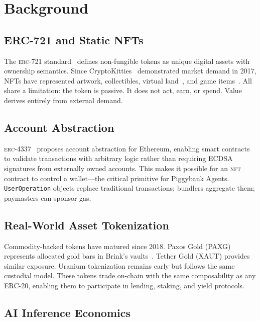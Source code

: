 \documentclass[11pt,letterpaper]{article}
\newcommand{\NFT}{\textsc{nft}}
\newcommand{\ERC}{\textsc{erc}}
\begin{document}
\section{Background}
\label{sec:background}

\subsection{ERC-721 and Static NFTs}

The \ERC{}-721 standard~\cite{erc721} defines non-fungible tokens as unique digital assets with ownership semantics. Since CryptoKitties~\cite{cryptokitties} demonstrated market demand in 2017, NFTs have represented artwork, collectibles, virtual land~\cite{decentraland, sandbox}, and game items~\cite{axie}. All share a limitation: the token is passive. It does not act, earn, or spend. Value derives entirely from external demand.

\subsection{Account Abstraction}

\ERC{}-4337~\cite{erc4337} proposes account abstraction for Ethereum, enabling smart contracts to validate transactions with arbitrary logic rather than requiring ECDSA signatures from externally owned accounts. This makes it possible for an \NFT{} contract to control a wallet---the critical primitive for Piggybank Agents. \texttt{UserOperation} objects replace traditional transactions; bundlers aggregate them; paymasters can sponsor gas.

\subsection{Real-World Asset Tokenization}

Commodity-backed tokens have matured since 2018. Paxos Gold (PAXG) represents allocated gold bars in Brink's vaults~\cite{paxos}. Tether Gold (XAUT) provides similar exposure. Uranium tokenization remains early but follows the same custodial model. These tokens trade on-chain with the same composability as any ERC-20, enabling them to participate in lending, staking, and yield protocols.

\subsection{AI Inference Economics}
\end{document}
